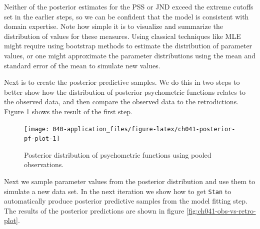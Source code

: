 \documentclass[11pt, oneside, openany]{scrbook}
\newenvironment{Shaded}{\begin{snugshade}}{\end{snugshade}}
\newcommand{\AttributeTok}[1]{\textcolor[rgb]{0.13,0.29,0.53}{#1}}
\newcommand{\ConstantTok}[1]{\textcolor[rgb]{0.56,0.35,0.01}{#1}}
\newcommand{\FunctionTok}[1]{\textcolor[rgb]{0.13,0.29,0.53}{\textbf{#1}}}
\newcommand{\NormalTok}[1]{#1}
\newcommand{\OtherTok}[1]{\textcolor[rgb]{0.56,0.35,0.01}{#1}}
\newcommand{\SpecialCharTok}[1]{\textcolor[rgb]{0.81,0.36,0.00}{\textbf{#1}}}
\begin{document}
Neither of the posterior estimates for the PSS or JND exceed the extreme cutoffs set in the earlier steps, so we can be confident that the model is consistent with domain expertise. Note how simple it is to visualize and summarize the distribution of values for these measures. Using classical techniques like MLE might require using bootstrap methods to estimate the distribution of parameter values, or one might approximate the parameter distributions using the mean and standard error of the mean to simulate new values.

Next is to create the posterior predictive samples. We do this in two steps to better show how the distribution of posterior psychometric functions relates to the observed data, and then compare the observed data to the retrodictions. Figure \ref{fig:ch041-posterior-pf-plot} shows the result of the first step.

\begin{figure}

{\centering \texttt{[image: 040-application\_files/figure-latex/ch041-posterior-pf-plot-1]} 

}

\caption{Posterior distribution of psychometric functions using pooled observations.}\label{fig:ch041-posterior-pf-plot}
\end{figure}

Next we sample parameter values from the posterior distribution and use them to simulate a new data set. In the next iteration we show how to get \texttt{Stan} to automatically produce posterior predictive samples from the model fitting step. The results of the posterior predictions are shown in figure \ref{fig:ch041-obs-vs-retro-plot}.


\begin{Shaded}
\end{Shaded}
\end{document}
